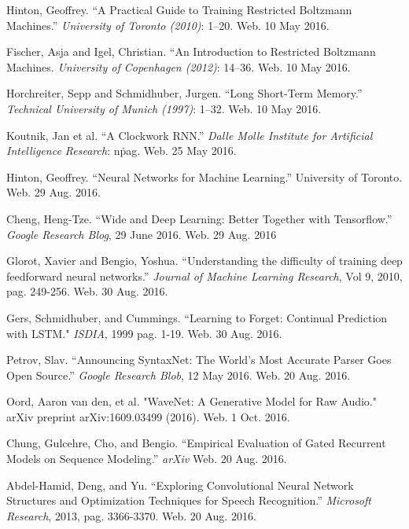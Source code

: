 \documentclass[12pt]{article}
\begin{document}
\begin{thebibliography}{9}
		Hinton, Geoffrey. ``A Practical Guide to Training Restricted Boltzmann
		Machines.'' \textit{University of Toronto (2010)}: 1--20. Web. 10 May
		2016.

		Fischer, Asja and Igel, Christian. ``An Introduction to Restricted
		Boltzmann Machines. \textit{University of Copenhagen (2012)}: 14--36. Web.
		10 May 2016.

		Horchreiter, Sepp and Schmidhuber, Jurgen. ``Long Short-Term Memory.''
		\textit{Technical University of Munich (1997)}: 1--32. Web. 10 May 2016.

		Koutnik, Jan et al. ``A Clockwork RNN.'' \textit{Dalle Molle Institute
		for Artificial Intelligence Research}: n\. pag. Web. 25 May 2016.

		Hinton, Geoffrey. ``Neural Networks for Machine Learning.'' University
		of Toronto. Web. 29 Aug. 2016.

		Cheng, Heng-Tze. ``Wide and Deep Learning: Better Together with
		Tensorflow.'' \textit{Google Research Blog}, 29 June 2016. Web. 29 Aug.
		2016

		Glorot, Xavier and Bengio, Yoshua. ``Understanding the difficulty of
		training deep feedforward neural networks.'' \textit{Journal of Machine
		Learning Research}, Vol 9, 2010, pag. 249-256. Web. 30 Aug. 2016.

		Gers, Schmidhuber, and Cummings. ``Learning to Forget: Continual
		Prediction with LSTM." \textit{ISDIA}, 1999 pag. 1-19. Web. 30 Aug.
		2016.

		Petrov, Slav. ``Announcing SyntaxNet: The World's Most Accurate Parser
		Goes Open Source.'' \textit{Google Research Blob}, 12 May 2016. Web. 20
		Aug. 2016.

		Oord, Aaron van den, et al. "WaveNet: A Generative Model for Raw Audio."
		arXiv preprint arXiv:1609.03499 (2016). Web. 1 Oct. 2016.

		Chung, Gulcehre, Cho, and Bengio. ``Empirical Evaluation of Gated
		Recurrent Models on Sequence Modeling.'' \textit{arXiv} Web. 20 Aug.
		2016.

		Abdel-Hamid, Deng, and Yu. ``Exploring Convolutional Neural Network
		Structures and Optimization Techniques for Speech Recognition.''
		\textit{Microsoft Research}, 2013, pag. 3366-3370. Web. 20 Aug. 2016.


\end{thebibliography}
\end{document}
